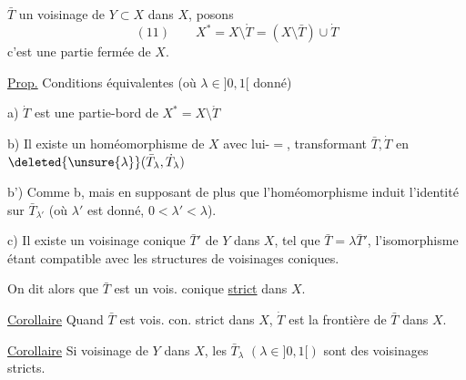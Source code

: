  $\bar T$ un voisinage
 de $Y\subset X$
dans $X$, posons
\[
(11)\qquad X^*=X\setminus\mathring T=(X\setminus\bar T)\cup\dot T
\]
c'est une partie fermée de $X$. 

\uline{Prop.} Conditions équivalentes (où $\lambda\in]0,1[$ donné)

a) $\dot T$ est une partie-bord de $X^*=X\setminus\mathring T$

b) Il existe un homéomorphisme de $X$
avec lui-$=$, transformant $\bar T,\dot T$ en
$\deleted{\unsure{\lambda}}(\bar T_\lambda,\dot T_\lambda)$

b') Comme b, mais en supposant de plus
que l'homéomorphisme induit l'identité
sur $\bar T_{\lambda'}$ (où 
$\lambda'$ est donné, $0<\lambda'<\lambda$).

c) Il existe un voisinage  conique $\bar T'$
de $Y$ dans $X$,  tel que $\bar T=\lambda\bar T'$,
l'isomorphisme étant compatible avec les
structures de voisinages coniques.

On dit alors que $\bar T$ est un vois.  conique
\uline{strict} dans $X$.


\uline{Corollaire} Quand $\bar T$ est vois.  con. strict dans $X$,
$\dot T$ est la frontière de $\bar T$ dans $X$.

\uline{Corollaire} Si  voisinage
 de $Y$
dans $X$, les $\bar T_\lambda$ $(\lambda\in]0,1[)$ sont des voisinages
 stricts.
